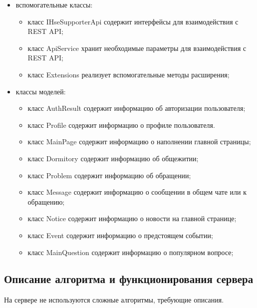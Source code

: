 \documentclass{../includes/TechDoc}
\begin{document}
\begin{itemize}
        \item вспомогательные классы:
        \begin{itemize}
            \item класс IHseSupporterApi содержит интерфейсы для взаимодействия с REST API;
            \item класс ApiService хранит необходимые параметры для взаимодействия с REST API;
            \item класс Extensions реализует вспомогательные методы расширения;
        \end{itemize}
        \item классы моделей:
        \begin{itemize}
            \item класс AuthResult содержит информацию об авторизации пользователя;
            \item класс Profile содержит информацию о профиле пользователя.
            \item класс MainPage содержит информацию о наполнении главной страницы;
            \item класс Dormitory содержит информацию об общежитии;
            \item класс Problem содержит информацию об обращении;
            \item класс Message содержит информацию о сообщении в общем чате или к обращению;
            \item класс Notice содержит информацию о новости на главной странице;
            \item класс Event содержит информацию о предстоящем событии;
            \item класс MainQuestion содержит информацию о популярном вопросе;
        \end{itemize}
    \end{itemize}

    \subsection{Описание алгоритма и функционирования сервера}

    На сервере не используются сложные алгоритмы, требующие описания.
\end{document}
